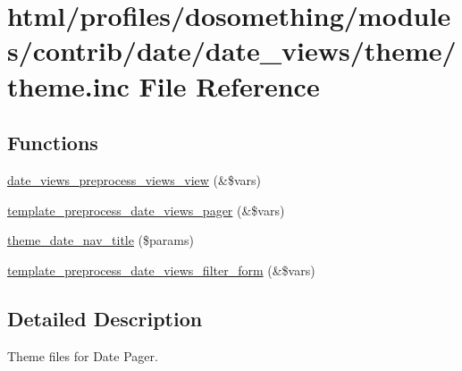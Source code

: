 \hypertarget{profiles_2dosomething_2modules_2contrib_2date_2date__views_2theme_2theme_8inc}{
\section{html/profiles/dosomething/modules/contrib/date/date\_\-views/theme/theme.inc File Reference}
\label{profiles_2dosomething_2modules_2contrib_2date_2date__views_2theme_2theme_8inc}
}
\subsection*{Functions}
\begin{DoxyCompactItemize}
\item 
\hyperlink{profiles_2dosomething_2modules_2contrib_2date_2date__views_2theme_2theme_8inc_ab67663862ed1c6814df08985535deac4}{date\_\-views\_\-preprocess\_\-views\_\-view} (\&\$vars)
\item 
\hyperlink{profiles_2dosomething_2modules_2contrib_2date_2date__views_2theme_2theme_8inc_a56a9786075b290f33f11b726d0cf2ea3}{template\_\-preprocess\_\-date\_\-views\_\-pager} (\&\$vars)
\item 
\hyperlink{profiles_2dosomething_2modules_2contrib_2date_2date__views_2theme_2theme_8inc_a9ee084f70e1a7136f0897268e2ef1f1b}{theme\_\-date\_\-nav\_\-title} (\$params)
\item 
\hyperlink{profiles_2dosomething_2modules_2contrib_2date_2date__views_2theme_2theme_8inc_a6f8e5b713bf6b16aa6ac6bb1f2a6836e}{template\_\-preprocess\_\-date\_\-views\_\-filter\_\-form} (\&\$vars)
\end{DoxyCompactItemize}


\subsection{Detailed Description}
Theme files for Date Pager. 

